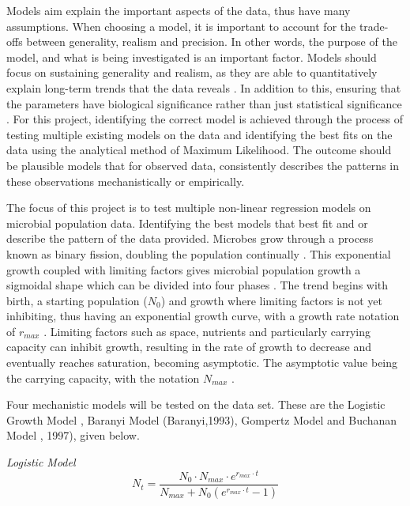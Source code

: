 \documentclass[11pt]{article}
\begin{document}
Models aim explain the important aspects of the data, thus have many assumptions. When choosing a model, it is important to account for the trade-offs between generality, realism and precision. In other words, the purpose of the model, and what is being investigated is an important factor. Models should focus on sustaining generality and realism, as they are able to quantitatively explain long-term trends that the data reveals \cite{levins1966strategy}.  In addition to this, ensuring that the parameters have biological significance rather than just statistical significance \cite{johnson2004model}. For this project, identifying the correct model is achieved through the process of testing multiple existing models on the data and identifying the best fits on the data using the analytical method of Maximum Likelihood. The outcome should be plausible models that for observed data, consistently describes the patterns in these observations mechanistically or empirically.

The focus of this project is to test multiple non-linear regression models on microbial population data. Identifying the best models that best fit and or describe the pattern of the data provided. Microbes grow through a process known as binary fission, doubling the population continually \cite{webb1986logistic}. This exponential growth coupled with limiting factors gives microbial population growth a sigmoidal shape which can be divided into four phases \cite{peleg2011microbial}. The trend begins with birth, a starting population ($N_0$) and growth where limiting factors is not yet inhibiting, thus having an exponential growth curve, with a growth rate notation of $r_{max}$ \cite{zwietering1990modeling}. Limiting factors such as space, nutrients and particularly carrying capacity can inhibit growth, resulting in the rate of growth to decrease and eventually reaches saturation, becoming asymptotic. The asymptotic value being the carrying capacity, with the notation $N_{max}$ \cite{zwietering1990modeling}.

Four mechanistic models will be tested on the data set. These are the Logistic Growth Model \cite{bacaer2011verhulst}, Baranyi Model (Baranyi,1993), Gompertz Model \cite{zwietering1990modeling} and Buchanan Model \cite{buchanan1997simple}, 1997), given below.

\textit{Logistic Model}
\begin{equation*}
    N_t = \frac{N_0 \cdot N_{max} \cdot e^{r_{max} \cdot t}}{N_{max} + N_0(e^{r_{max} \cdot t} -1)} \label{eq:Logistic Model} \tag{1.1}
\end{equation*}
\end{document}
